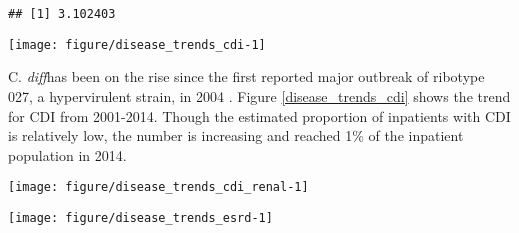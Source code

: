 \documentclass[12pt]{ociamthesis}\usepackage[]{graphicx}\usepackage[]{color}
\makeatletter
\def\maxwidth{ %
  \ifdim\Gin@nat@width>\linewidth
    \linewidth
  \else
    \Gin@nat@width
  \fi
}
\newenvironment{kframe}{%
 \def\at@end@of@kframe{}%
 \ifinner\ifhmode%
  \def\at@end@of@kframe{\end{minipage}}%
  \begin{minipage}{\columnwidth}%
 \fi\fi%
 \def\FrameCommand##1{\hskip\@totalleftmargin \hskip-\fboxsep
 \colorbox{shadecolor}{##1}\hskip-\fboxsep
     \hskip-\linewidth \hskip-\@totalleftmargin \hskip\columnwidth}%
 \MakeFramed {\advance\hsize-\width
   \@totalleftmargin\z@ \linewidth\hsize
   \@setminipage}}%
 {\par\unskip\endMakeFramed%
 \at@end@of@kframe}
\newenvironment{knitrout}{}{} %
\newcommand{\cdiff}{C. \textit{diff}}
\makeatother
\begin{document}
\begin{knitrout}
\color{fgcolor}\begin{kframe}


{\ttfamily\noindent\itshape\color{messagecolor}{\#\# Parsed with column specification:\\\#\# cols(\\\#\#\ \  disease = col\_character(),\\\#\#\ \  year = col\_double(),\\\#\#\ \  theta = col\_double(),\\\#\#\ \  ci2.5 = col\_double(),\\\#\#\ \  ci97.5 = col\_double()\\\#\# )}}\begin{verbatim}
## [1] 3.102403
\end{verbatim}
\end{kframe}
\texttt{[image: figure/disease\_trends\_cdi-1]} 

\end{knitrout}

\cdiff has been on the rise since the first reported major outbreak of ribotype 027, a hypervirulent strain, in 2004 \cite{Pepin2004}. 
Figure \ref{disease_trends_cdi} shows the trend for CDI from 2001-2014. Though the estimated proportion of inpatients with CDI is 
relatively low, the number is increasing and reached 1\% of the inpatient population in 2014. 

\begin{knitrout}
\color{fgcolor}
\texttt{[image: figure/disease\_trends\_cdi\_renal-1]} 

\end{knitrout}



\begin{knitrout}
\color{fgcolor}\begin{kframe}


{\ttfamily\noindent\itshape\color{messagecolor}{\#\# Parsed with column specification:\\\#\# cols(\\\#\#\ \  age = col\_integer(),\\\#\#\ \  nis\_year = col\_integer(),\\\#\#\ \  discwt = col\_double()\\\#\# )}}\end{kframe}
\texttt{[image: figure/disease\_trends\_esrd-1]} 

\end{knitrout}
\end{document}
